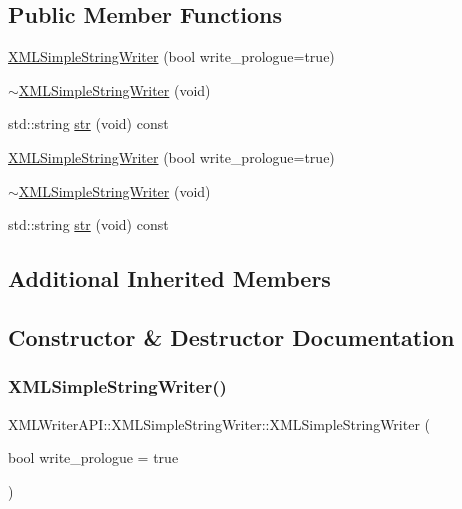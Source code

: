 \subsection*{Public Member Functions}
\begin{DoxyCompactItemize}
\item 
\mbox{\hyperlink{classXMLWriterAPI_1_1XMLSimpleStringWriter_a7caa663dd64c87fa0eabc563154143a5}{X\+M\+L\+Simple\+String\+Writer}} (bool write\+\_\+prologue=true)
\item 
\mbox{\hyperlink{classXMLWriterAPI_1_1XMLSimpleStringWriter_a10b08cc22793241a637eefa425e0ebe5}{$\sim$\+X\+M\+L\+Simple\+String\+Writer}} (void)
\item 
std\+::string \mbox{\hyperlink{classXMLWriterAPI_1_1XMLSimpleStringWriter_ae316d9565925e9605c38eb0a14e99e90}{str}} (void) const
\item 
\mbox{\hyperlink{classXMLWriterAPI_1_1XMLSimpleStringWriter_a7caa663dd64c87fa0eabc563154143a5}{X\+M\+L\+Simple\+String\+Writer}} (bool write\+\_\+prologue=true)
\item 
\mbox{\hyperlink{classXMLWriterAPI_1_1XMLSimpleStringWriter_a10b08cc22793241a637eefa425e0ebe5}{$\sim$\+X\+M\+L\+Simple\+String\+Writer}} (void)
\item 
std\+::string \mbox{\hyperlink{classXMLWriterAPI_1_1XMLSimpleStringWriter_ae316d9565925e9605c38eb0a14e99e90}{str}} (void) const
\end{DoxyCompactItemize}
\subsection*{Additional Inherited Members}


\subsection{Constructor \& Destructor Documentation}
\mbox{\label{classXMLWriterAPI_1_1XMLSimpleStringWriter_a7caa663dd64c87fa0eabc563154143a5}} 
\subsubsection{\texorpdfstring{XMLSimpleStringWriter()}{XMLSimpleStringWriter()}\hspace{0.1cm}{\footnotesize\ttfamily [1/2]}}
{\footnotesize\ttfamily X\+M\+L\+Writer\+A\+P\+I\+::\+X\+M\+L\+Simple\+String\+Writer\+::\+X\+M\+L\+Simple\+String\+Writer (\begin{DoxyParamCaption}\item[{bool}]{write\+\_\+prologue = {\ttfamily true} }\end{DoxyParamCaption})\hspace{0.3cm}{\ttfamily [inline]}}

